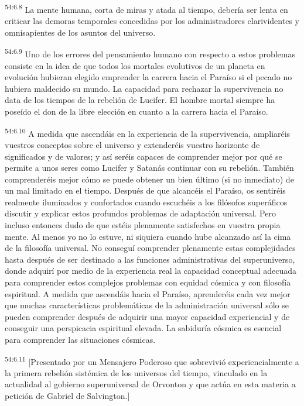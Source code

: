 \par
\textsuperscript{54:6.8} La mente humana, corta de miras y atada al tiempo, debería ser lenta en criticar las demoras temporales concedidas por los administradores clarividentes y omnisapientes de los asuntos del universo.

\par
\textsuperscript{54:6.9} Uno de los errores del pensamiento humano con respecto a estos problemas consiste en la idea de que todos los mortales evolutivos de un planeta en evolución hubieran elegido emprender la carrera hacia el Paraíso si el pecado no hubiera maldecido su mundo. La capacidad para rechazar la supervivencia no data de los tiempos de la rebelión de Lucifer. El hombre mortal siempre ha poseído el don de la libre elección en cuanto a la carrera hacia el Paraíso.

\par
\textsuperscript{54:6.10} A medida que ascendáis en la experiencia de la supervivencia, ampliaréis vuestros conceptos sobre el universo y extenderéis vuestro horizonte de significados y de valores; y así seréis capaces de comprender mejor por qué se permite a unos seres como Lucifer y Satanás continuar con su rebelión. También comprenderéis mejor cómo se puede obtener un bien último (si no inmediato) de un mal limitado en el tiempo. Después de que alcancéis el Paraíso, os sentiréis realmente iluminados y confortados cuando escuchéis a los filósofos superáficos discutir y explicar estos profundos problemas de adaptación universal. Pero incluso entonces dudo de que estéis plenamente satisfechos en vuestra propia mente. Al menos yo no lo estuve, ni siquiera cuando hube alcanzado así la cima de la filosofía universal. No conseguí comprender plenamente estas complejidades hasta después de ser destinado a las funciones administrativas del superuniverso, donde adquirí por medio de la experiencia real la capacidad conceptual adecuada para comprender estos complejos problemas con equidad cósmica y con filosofía espiritual. A medida que ascendáis hacia el Paraíso, aprenderéis cada vez mejor que muchas características problemáticas de la administración universal sólo se pueden comprender después de adquirir una mayor capacidad experiencial y de conseguir una perspicacia espiritual elevada. La sabiduría cósmica es esencial para comprender las situaciones cósmicas.

\par
\textsuperscript{54:6.11} [Presentado por un Mensajero Poderoso que sobrevivió experiencialmente a la primera rebelión sistémica de los universos del tiempo, vinculado en la actualidad al gobierno superuniversal de Orvonton y que actúa en esta materia a petición de Gabriel de Salvington.]